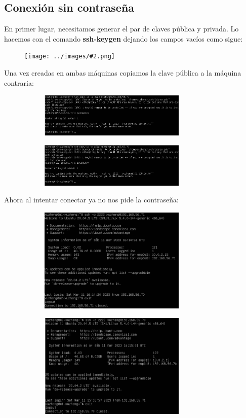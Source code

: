 \documentclass[twoside]{article}
\newcommand{\image}[2]{
\begin{figure}[H]
    \texttt{[image: ../images/\#2.png]}
    \centering
\end{figure}
}
\begin{document}
\subsection{Conexión sin contraseña}
En primer lugar, necesitamos generar el par de claves pública y privada. Lo hacemos con el comando \textbf{ssh-keygen} dejando los campos vacíos como sigue:
\image{8}{36}
Una vez creadas en ambas máquinas copiamos la clave pública a la máquina contraria:
\begin{figure}[H]
    \centering
    \begin{subfigure}{.5\textwidth}
        \centering
        \includegraphics[width=7cm]{../images/37.png}
    \end{subfigure}%
    \begin{subfigure}{.5\textwidth}
        \centering
        \includegraphics[width=7cm]{../images/38.png}
    \end{subfigure}
\end{figure}
Ahora al intentar conectar ya no nos pide la contraseña:
\begin{figure}[H]
    \centering
    \begin{subfigure}{.5\textwidth}
        \centering
        \includegraphics[width=7cm]{../images/39.png}
    \end{subfigure}%
    \begin{subfigure}{.5\textwidth}
        \centering
        \includegraphics[width=7cm]{../images/40.png}
    \end{subfigure}
\end{figure}
\newpage
\end{document}
